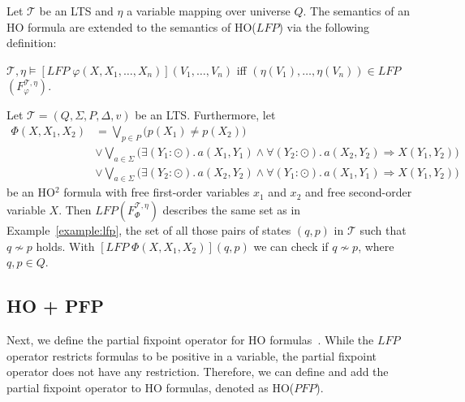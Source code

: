 \begin{definition}
    Let $\mathcal{T}$ be an LTS and $\eta$ a variable mapping over universe $Q$. The
    semantics of an HO formula are extended to the semantics of HO($\mathit{LFP}$) via the following definition:
    \begin{compactitem}
        \item $\mathcal{T}, \eta \models [\mathit{LFP}\;\varphi(X, X_1, \dots, X_n)](V_1, \dots,
        V_n)$ iff $(\eta(V_1), \dots, \eta(V_n)) \in \mathit{LFP}$ $(F_\varphi^{\mathcal{T}, \eta})$.
    \end{compactitem}
\end{definition}

\begin{example}
    \label{example:ho_lfp} 
    Let $\mathcal{T} = (Q, \Sigma, P, \Delta, v)$ be an LTS. Furthermore, let 
\begin{align*}
\Phi(X, X_1, X_2) &= \underset{p\in P}{\bigvee} \big(p(X_1) \neq p(X_2)\big)\\&
 \vee \underset{a\in\Sigma}{\bigvee} \big(\exists (Y_1 \colon \odot).\, a(X_1, Y_1) \wedge \forall (Y_2 
 \colon \odot).\, a(X_2,Y_2) \Rightarrow X(Y_1, Y_2)\big) \\&
\vee \underset{a\in\Sigma}{\bigvee} \big(\exists (Y_2 \colon \odot).\, a(X_2, Y_2) \wedge \forall (Y_1 
\colon \odot).\, a(X_1,Y_1) \Rightarrow X(Y_1, Y_2)\big)
\end{align*}
be an HO$^2$ formula with free first-order variables $x_1$ and $x_2$ and free second-order variable $X$.
Then $LFP(F_\Phi^{\mathcal{T}, \eta})$ describes the same set as in Example~\ref{example:lfp}, the set of all those pairs of states $(q, p)$ in $\mathcal{T}$ such that $q\not\sim p$ holds. With $[LFP\; \Phi(X, X_1, X_2)](q, p)$ we can check if $q \not\sim p$, where $q, p \in Q$. 
\end{example}

\subsection{HO + PFP}\label{subsec:ho+Pfp}

Next, we define the partial fixpoint operator for HO formulas~\cite{schewe2006fixpoint}. While the
$\mathit{LFP}$ operator restricts formulas to be positive in a variable, the partial fixpoint operator does not have any
restriction. Therefore, we can define and
add the partial fixpoint operator to HO formulas, denoted as HO($\mathit{PFP}$).

